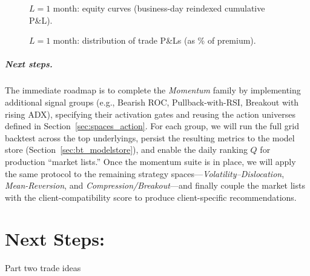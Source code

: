 \documentclass[12pt,a4paper]{report}
\begin{document}
\begin{figure}[h]
\centering
\fbox{\rule{0pt}{1.65in}\rule{.32\linewidth}{0pt}}\hfill
\fbox{\rule{0pt}{1.65in}\rule{.32\linewidth}{0pt}}\hfill
\fbox{\rule{0pt}{1.65in}\rule{.32\linewidth}{0pt}}
\caption{$L=1$ month: equity curves (business-day reindexed cumulative P\&L).}
\label{fig:mombull_L1_equity}
\end{figure}

\begin{figure}[h]
\centering
\fbox{\rule{0pt}{1.65in}\rule{.32\linewidth}{0pt}}\hfill
\fbox{\rule{0pt}{1.65in}\rule{.32\linewidth}{0pt}}\hfill
\fbox{\rule{0pt}{1.65in}\rule{.32\linewidth}{0pt}}
\caption{$L=1$ month: distribution of trade P\&Ls (as \% of premium).}
\label{fig:mombull_L1_hist}
\end{figure}



\paragraph{Next steps.}
The immediate roadmap is to complete the \emph{Momentum} family by implementing additional signal groups (e.g., Bearish ROC, Pullback-with-RSI, Breakout with rising ADX), specifying their activation gates and reusing the action universes defined in Section~\ref{sec:spaces_action}. For each group, we will run the full grid backtest across the top underlyings, persist the resulting metrics to the model store (Section~\ref{sec:bt_modelstore}), and enable the daily ranking $Q$ for production “market lists.” Once the momentum suite is in place, we will apply the same protocol to the remaining strategy spaces—\emph{Volatility–Dislocation}, \emph{Mean-Reversion}, and \emph{Compression/Breakout}—and finally couple the market lists with the client-compatibility score to produce client-specific recommendations.


\chapter{Next Steps: }
Part two trade ideas 
\end{document}
